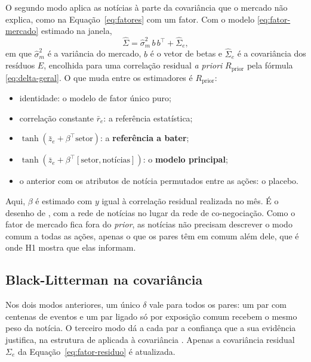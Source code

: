O segundo modo aplica as notícias à parte da covariância que o mercado não explica, como na
Equação~\eqref{eq:fatores} com um fator. Com o modelo \eqref{eq:fator-mercado} estimado na janela,
\begin{equation}
  \hat\Sigma = \hat\sigma_m^2\, b\, b^\top + \hat\Sigma_e,
  \label{eq:fator-residuo}
\end{equation}
em que $\hat\sigma_m^2$ é a variância do mercado, $b$ é o vetor de betas e $\hat\Sigma_e$ é a covariância
dos resíduos $E$, encolhida para uma correlação residual \emph{a priori} $R_{\mathrm{prior}}$ pela fórmula
\eqref{eq:delta-geral}. O que muda entre os estimadores é $R_{\mathrm{prior}}$:
\begin{itemize}
  \item identidade: o modelo de fator único puro;
  \item correlação constante $\bar r_e$: a referência estatística;
  \item $\tanh(\bar z_e+\beta^\top\text{setor})$: a \textbf{referência a bater};
  \item $\tanh(\bar z_e+\beta^\top[\text{setor},\text{notícias}])$: o \textbf{modelo principal};
  \item o anterior com os atributos de notícia permutados entre as ações: o placebo.
\end{itemize}
Aqui, $\beta$ é estimado com $y$ igual à correlação residual realizada no mês. É o desenho de
\citet{lu2023}, com a rede de notícias no lugar da rede de co-negociação. Como o fator de mercado fica
fora do \emph{prior}, as notícias não precisam descrever o modo comum a todas as ações, apenas o que os
pares têm em comum além dele, que é onde H1 mostra que elas informam.

\subsection{Black-Litterman na covariância}

Nos dois modos anteriores, um único $\delta$ vale para todos os pares: um par com centenas de eventos e
um par ligado só por exposição comum recebem o mesmo peso da notícia. O terceiro modo dá a cada par a
confiança que a sua evidência justifica, na estrutura de \citet{black1992} aplicada à covariância
\citep{qian2001}. Apenas a covariância residual $\Sigma_e$ da Equação~\eqref{eq:fator-residuo} é
atualizada.

